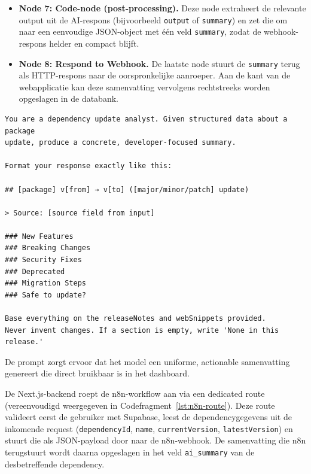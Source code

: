 \begin{itemize}
    \item \textbf{Node 7: Code-node (post-processing).} Deze node extraheert de relevante output uit de AI-respons (bijvoorbeeld \texttt{output} of \texttt{summary}) en zet die om naar een eenvoudige JSON-object met één veld \texttt{summary}, zodat de webhook-respons helder en compact blijft.
    \item \textbf{Node 8: Respond to Webhook.} De laatste node stuurt de \texttt{summary} terug als HTTP-respons naar de oorspronkelijke aanroeper. Aan de kant van de webapplicatie kan deze samenvatting vervolgens rechtstreeks worden opgeslagen in de databank.
\end{itemize}

\begin{listing}[H]
\begin{verbatim}
You are a dependency update analyst. Given structured data about a package
update, produce a concrete, developer-focused summary.

Format your response exactly like this:

## [package] v[from] → v[to] ([major/minor/patch] update)

> Source: [source field from input]

### New Features
### Breaking Changes
### Security Fixes
### Deprecated
### Migration Steps
### Safe to update?

Base everything on the releaseNotes and webSnippets provided.
Never invent changes. If a section is empty, write 'None in this release.'
\end{verbatim}
\caption{System prompt van de n8n Node 6 (Gemini AI-agent) met strikt outputformaat}
\label{lst:n8n-system-prompt}
\end{listing}

De prompt zorgt ervoor dat het model een uniforme, actionable samenvatting genereert die direct bruikbaar is in het dashboard.

De Next.js-backend roept de n8n-workflow aan via een dedicated route (vereenvoudigd weergegeven in Codefragment~\ref{lst:n8n-route}). Deze route valideert eerst de gebruiker met Supabase, leest de dependencygegevens uit de inkomende request (\texttt{dependencyId}, \texttt{name}, \texttt{currentVersion}, \texttt{latestVersion}) en stuurt die als JSON-payload door naar de n8n-webhook. De samenvatting die n8n terugstuurt wordt daarna opgeslagen in het veld \texttt{ai\_summary} van de desbetreffende dependency.

